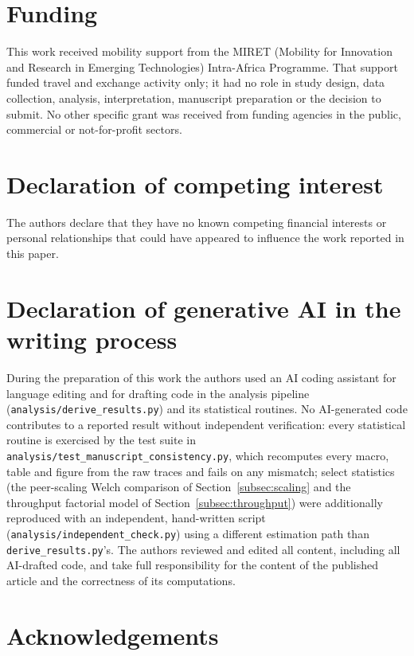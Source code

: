 \documentclass[a4paper,fleqn]{cas-dc}
\begin{document}
\section*{Funding}

This work received mobility support from the MIRET (Mobility for
Innovation and Research in Emerging Technologies) Intra-Africa Programme.
That support funded travel and exchange activity only; it had no role in
study design, data collection, analysis, interpretation, manuscript
preparation or the decision to submit. No other specific grant was
received from funding agencies in the public, commercial or
not-for-profit sectors.

\section*{Declaration of competing interest}

The authors declare that they have no known competing financial interests or
personal relationships that could have appeared to influence the work
reported in this paper.

\section*{Declaration of generative AI in the writing process}

During the preparation of this work the authors used an AI coding assistant
for language editing and for drafting code in the analysis pipeline
(\texttt{analysis/derive\_results.py}) and its statistical routines. No
AI-generated code contributes to a reported result without independent
verification: every statistical routine is exercised by the test suite in
\texttt{analysis/test\_manuscript\_consistency.py}, which recomputes every
macro, table and figure from the raw traces and fails on any mismatch;
select statistics (the peer-scaling Welch comparison of
Section~\ref{subsec:scaling} and the throughput factorial model of
Section~\ref{subsec:throughput}) were additionally reproduced with an
independent, hand-written script (\texttt{analysis/independent\_check.py})
using a different estimation path than \texttt{derive\_results.py}'s. The
authors reviewed and edited all content, including all AI-drafted code,
and take full responsibility for the content of the published article and
the correctness of its computations.

\section*{Acknowledgements}
\end{document}
